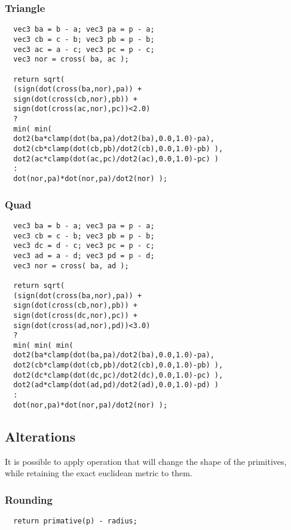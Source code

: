 \documentclass[../pbr.text]{subfile}
\begin{document}
\subsubsection{Triangle}%
\label{ssub:triangle}
\begin{verbatim}
  vec3 ba = b - a; vec3 pa = p - a;
  vec3 cb = c - b; vec3 pb = p - b;
  vec3 ac = a - c; vec3 pc = p - c;
  vec3 nor = cross( ba, ac );

  return sqrt(
  (sign(dot(cross(ba,nor),pa)) +
  sign(dot(cross(cb,nor),pb)) +
  sign(dot(cross(ac,nor),pc))<2.0)
  ?
  min( min(
  dot2(ba*clamp(dot(ba,pa)/dot2(ba),0.0,1.0)-pa),
  dot2(cb*clamp(dot(cb,pb)/dot2(cb),0.0,1.0)-pb) ),
  dot2(ac*clamp(dot(ac,pc)/dot2(ac),0.0,1.0)-pc) )
  :
  dot(nor,pa)*dot(nor,pa)/dot2(nor) );
\end{verbatim}

\subsubsection{Quad}%
\label{ssub:quad}
\begin{verbatim}
  vec3 ba = b - a; vec3 pa = p - a;
  vec3 cb = c - b; vec3 pb = p - b;
  vec3 dc = d - c; vec3 pc = p - c;
  vec3 ad = a - d; vec3 pd = p - d;
  vec3 nor = cross( ba, ad );

  return sqrt(
  (sign(dot(cross(ba,nor),pa)) +
  sign(dot(cross(cb,nor),pb)) +
  sign(dot(cross(dc,nor),pc)) +
  sign(dot(cross(ad,nor),pd))<3.0)
  ?
  min( min( min(
  dot2(ba*clamp(dot(ba,pa)/dot2(ba),0.0,1.0)-pa),
  dot2(cb*clamp(dot(cb,pb)/dot2(cb),0.0,1.0)-pb) ),
  dot2(dc*clamp(dot(dc,pc)/dot2(dc),0.0,1.0)-pc) ),
  dot2(ad*clamp(dot(ad,pd)/dot2(ad),0.0,1.0)-pd) )
  :
  dot(nor,pa)*dot(nor,pa)/dot2(nor) );
\end{verbatim}

\subsection{Alterations}%
\label{sub:alterations}

It is possible to apply operation that will change the shape of the primitives,
while retaining the exact euclidean metric to them.

\subsubsection{Rounding}%
\label{ssub:rounding}
\begin{verbatim}
  return primative(p) - radius;
\end{verbatim}
\end{document}
